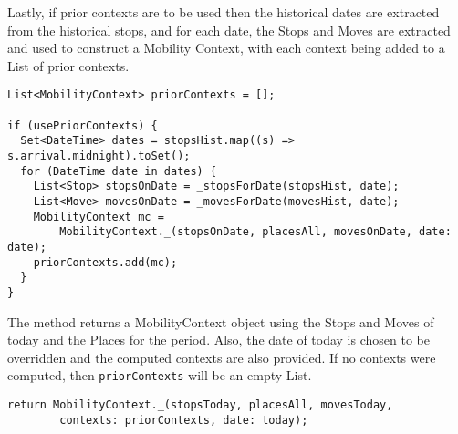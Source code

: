 Lastly, if prior contexts are to be used then the historical dates are extracted from the historical stops, and for each date, the Stops and Moves are extracted and used to construct a Mobility Context, with each context being added to a List of prior contexts.

\begin{verbatim}
List<MobilityContext> priorContexts = [];

if (usePriorContexts) {
  Set<DateTime> dates = stopsHist.map((s) => s.arrival.midnight).toSet();
  for (DateTime date in dates) {
    List<Stop> stopsOnDate = _stopsForDate(stopsHist, date);
    List<Move> movesOnDate = _movesForDate(movesHist, date);
    MobilityContext mc =
        MobilityContext._(stopsOnDate, placesAll, movesOnDate, date: date);
    priorContexts.add(mc);
  }
}
\end{verbatim}

The method returns a MobilityContext object using the Stops and Moves of today and the Places for the period. Also, the date of today is chosen to be overridden and the computed contexts are also provided. If no contexts were computed, then \verb|priorContexts| will be an empty List.

\begin{verbatim}
return MobilityContext._(stopsToday, placesAll, movesToday,
        contexts: priorContexts, date: today);
\end{verbatim}

